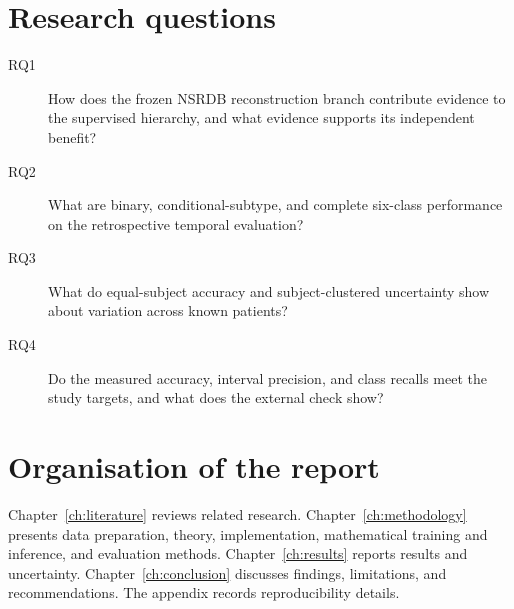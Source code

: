 \section{Research questions}
\begin{description}
\item[RQ1] How does the frozen NSRDB reconstruction branch contribute evidence
to the supervised hierarchy, and what evidence supports its independent benefit?
\item[RQ2] What are binary, conditional-subtype, and complete six-class
performance on the retrospective temporal evaluation?
\item[RQ3] What do equal-subject accuracy and subject-clustered uncertainty
show about variation across known patients?
\item[RQ4] Do the measured accuracy, interval precision, and class recalls
meet the study targets, and what does the external check show?
\end{description}

\section{Organisation of the report}
Chapter~\ref{ch:literature} reviews related research.
Chapter~\ref{ch:methodology} presents data preparation, theory, implementation,
mathematical training and inference, and evaluation methods.
Chapter~\ref{ch:results} reports results and uncertainty.
Chapter~\ref{ch:conclusion} discusses findings, limitations, and recommendations.
The appendix records reproducibility details.
